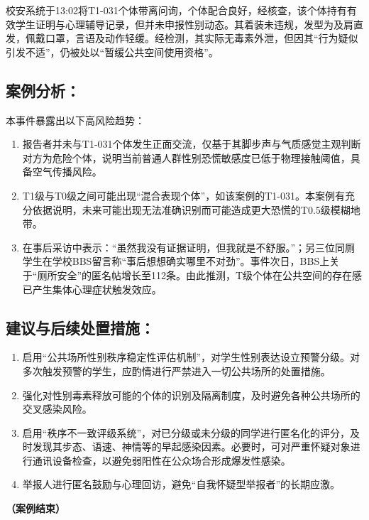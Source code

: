 \documentclass[]{ctexrep}
\begin{document}
	校安系统于13:02将T1-031个体带离问询，个体配合良好，经核查，该个体持有有效学生证明与心理辅导记录，但并未申报性别动态。其着装未违规，发型为及肩直发，佩戴口罩，言语及动作轻缓。经检测，其实际无毒素外泄，但因其“行为疑似引发不适”，仍被处以“暂缓公共空间使用资格”。
	
	\subsection{案例分析：}
	本事件暴露出以下高风险趋势：
	
	\begin{enumerate}
		\item 报告者并未与T1-031个体发生正面交流，仅基于其脚步声与气质感觉主观判断对方为危险个体，说明当前普通人群性别恐慌敏感度已低于物理接触阈值，具备空气传播风险。
		
		\item T1级与T0级之间可能出现“混合表现个体”，如该案例的T1-031。本案例有充分依据说明，未来可能出现无法准确识别而可能造成更大恐慌的T0.5级模糊地带。
		
		\item {}在事后采访中表示：“虽然我没有证据证明，但我就是不舒服。”；另三位同厕学生在学校BBS留言称“事后想想确实哪里不对劲”。事件次日，BBS上关于“厕所安全”的匿名帖增长至112条。由此推测，T级个体在公共空间的存在感已产生集体心理症状触发效应。
	\end{enumerate}
	\subsection{建议与后续处置措施：}
	\begin{enumerate}
		\item 启用“公共场所性别秩序稳定性评估机制”，对学生性别表达设立预警分级。对多次触发预警的学生，应酌情进行严禁进入一切公共场所的处置措施。
		
		\item 强化对性别毒素释放可能的个体的识别及隔离制度，及时避免各种公共场所的交叉感染风险。
		
		\item 启用“秩序不一致评级系统”，对已分级或未分级的同学进行匿名化的评分，及时发现其步态、语速、神情等的早起感染因素。必要时，可对严重怀疑对象进行通讯设备检查，以避免弱阳性在公众场合形成爆发性感染。
		\item 举报人进行匿名鼓励与心理回访，避免“自我怀疑型举报者”的长期应激。
	\end{enumerate}
	\begin{flushright}
		\textbf{（案例结束）}
	\end{flushright}
	
\end{document}
